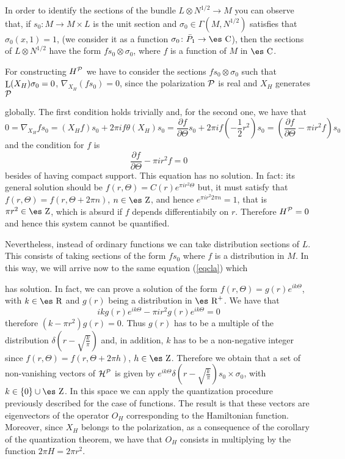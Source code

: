 \documentclass[12pt]{article}
\def\beq{\begin{equation}}
\def\eeq{\end{equation}}
\def\derpar#1#2{\frac{\partial{#1}}{\partial{#2}}}
\def\Zahl{\mbox{\es Z}}
\def\Real{\mbox{\es R}}
\def\Complex{\mbox{\es C}}
\def\Lie{\mathop{\rm L}\nolimits}
\begin{document}
In order to identify the sections of the bundle
$L \otimes N^{1/2} \to M$ you can observe that, if
$s_0 \colon M \to M \times L$ is the unit section and
$\sigma_0 \in \Gamma (M,N^{1/2})$ satisfies that
$\sigma_0(x,1)=1$, (we consider it as a function
$\sigma_0 \colon \bar P_1 \to \Complex$),
then the sections of $L \otimes N^{1/2}$ have the form
$fs_0 \otimes \sigma_0$, where $f$ is a function of $M$ in $\Complex$.

For constructing $H^{\cal P}$ we have to consider the sections
$fs_0 \otimes \sigma_0$ such that
$\Lie(X_H)\sigma_0=0$, $\nabla_{X_H}(fs_0)=0$,
since the polarization ${\cal P}$ is real and $X_H$ generates ${\cal P}$

globally.
The first condition holds trivially and, for the second one, we have
that
$$
0=\nabla_{X_H}fs_0 =(X_Hf)s_0 + 2\pi i f \theta (X_H)s_0=
\derpar{f}{\Theta}s_0 + 2\pi i f(-\frac{1}{2}r^2)s_0 =
(\derpar{f}{\Theta} - \pi i r^2 f)s_0
$$
and the condition for $f$ is
\beq
\derpar{f}{\Theta} - \pi i r^2 f = 0
\label{eqcla}
\eeq
besides of having compact support. This equation has no solution.
In fact: its general solution should be $f(r,\Theta) = C(r)e^{\pi i r^2
\Theta}$
but, it must satisfy that $f(r,\Theta) = f(r,\Theta+2\pi n)$, $n \in
\Zahl$,
and hence $e^{\pi i r^2 2 \pi n} = 1$,
that is $\pi r^2 \in \Zahl$, which is absurd if $f$ depends
differentiabily on $r$.
Therefore $H^{\cal P}=0$ and hence this system cannot be quantified.

Nevertheless, instead of ordinary functions we can take distribution
sections of $L$.
This consists of taking sections of the form $fs_0$ where $f$ is a
distribution in $M$.
In this way, we will arrive now to the same equation (\ref{eqcla}) which

has solution.
In fact, we can prove a solution of the form
$f(r,\Theta)=g(r)e^{ik\Theta}$, with $k \in \Real$ and $g(r)$
being a distribution in $\Real^+$. We have that
$$
ikg(r)e^{ik\Theta}-\pi ir^2g(r)e^{ik\Theta}=0
$$
therefore $(k-\pi r^2)g(r)=0$.
Thus $g(r)$ has to be a multiple of the distribution $\delta
(r-\sqrt{\frac{k}{\pi}})$
and, in addition, $k$ has to be a non-negative integer since
$f(r,\Theta ) = f(r,\Theta +2\pi h)$, $h \in \Zahl$.
Therefore we obtain that a set of non-vanishing vectors of
${\cal H}^{\cal P}$ is given by
$e^{ik\Theta}\delta (r-\sqrt{\frac{k}{\pi}})s_0 \times \sigma_0$,
with $k\in\{ 0\}\cup\Zahl$.
In this space we can apply the quantization procedure previously
described
for the case of functions. The result is that these vectors are
eigenvectors of the operator $O_H$ corresponding to the Hamiltonian
function.
Moreover, since $X_H$ belongs to the polarization,
as a consequence of the corollary of the quantization theorem,
we have that $O_H$ consists in multiplying by the function $2\pi H =
2\pi r^2$.
\end{document}
